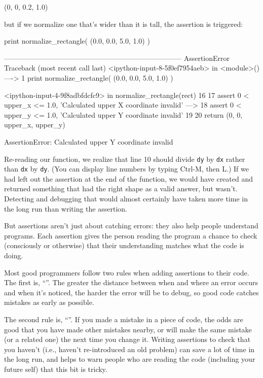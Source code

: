 \documentclass{book}
\begin{document}
\begin{VerbOut}
(0, 0, 0.2, 1.0)
\end{VerbOut}

but if we normalize one that's wider than it is tall, the assertion is
triggered:

\begin{VerbIn}
print normalize_rectangle( (0.0, 0.0, 5.0, 1.0) )
\end{VerbIn}

\begin{VerbErr}
---------------------------------------------------------------------------
AssertionError                            Traceback (most recent call last)
<ipython-input-8-5f0ef7954aeb> in <module>()
----> 1 print normalize_rectangle( (0.0, 0.0, 5.0, 1.0) )

<ipython-input-4-9f8adbfdcfc9> in normalize_rectangle(rect)
     16
     17     assert 0 < upper_x <= 1.0, 'Calculated upper X coordinate invalid'
---> 18     assert 0 < upper_y <= 1.0, 'Calculated upper Y coordinate invalid'
     19
     20     return (0, 0, upper_x, upper_y)

AssertionError: Calculated upper Y coordinate invalid
\end{VerbErr}

Re-reading our function, we realize that line 10 should divide
\texttt{dy} by \texttt{dx} rather than \texttt{dx} by \texttt{dy}. (You
can display line numbers by typing Ctrl-M, then L.) If we had left out
the assertion at the end of the function, we would have created and
returned something that had the right shape as a valid answer, but
wasn't. Detecting and debugging that would almost certainly have taken
more time in the long run than writing the assertion.

But assertions aren't just about catching errors: they also help people
understand programs. Each assertion gives the person reading the program
a chance to check (consciously or otherwise) that their understanding
matches what the code is doing.

Most good programmers follow two rules when adding assertions to their
code. The first is, ``''. The greater the distance between when and where an
error occurs and when it's noticed, the harder the error will be to
debug, so good code catches mistakes as early as possible.

The second rule is,
``''. If you made a mistake in a piece of code,
the odds are good that you have made other mistakes nearby, or will make
the same mistake (or a related one) the next time you change it. Writing
assertions to check that you haven't 
(i.e., haven't re-introduced an old problem) can save a lot of time in
the long run, and helps to warn people who are reading the code
(including your future self) that this bit is tricky.
\end{document}
